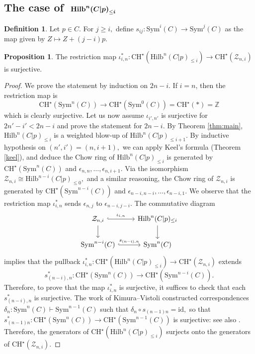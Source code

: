 \documentclass[10.5pt]{amsart}
\theoremstyle{definition}
\theoremstyle{definition}
\theoremstyle{definition}
\theoremstyle{definition}
\newtheorem{proposition}[theorem]{Proposition}
\newtheorem{definition}[theorem]{Definition}
\newcommand{\Hilb}{\mathrm{Hilb}}
\newcommand{\Sym}{\mathrm{Sym}}
\newcommand{\ra}{\rightarrow}
\newcommand{\CHs}{\mathrm{CH}^\star}
\newcommand{\cZ}{\mathcal{Z}}
\newcommand{\bZ}{\mathbb{Z}}
\begin{document}
\subsection{The case of $\textbf{ \text{Hilb}}^{\boldsymbol{n}}{\boldsymbol{(C|p)}}_{\le \boldsymbol{i}}$}
\begin{definition}\label{def:symimmersiononepoint}
    Let $p\in C.$ For $j\geq i,$ define $s_{ij}: \Sym^i(C) \ra \Sym^j(C)$ as the map given by $Z\mapsto Z + (j-i)p.$
\end{definition}



\begin{proposition}
The restriction map $\iota_{i,n}^*:\mathrm{CH}^\star(\Hilb^{n}(C|p)_{\leq i})\to \mathrm{CH}^\star(\cZ_{n,i})$ is surjective.
\end{proposition}
\begin{proof}
    We prove the statement by induction on $2n-i$. If $i=n$, then the restriction map is $$\CHs (\Sym^n(C)) \ra \CHs (\Sym^0(C))=\CHs (*)=\bZ$$ which is clearly surjective. 
    Let us now assume $\iota_{i',n'}$ is surjective for $2n'-i'< 2n-i$ and prove the statement for $2n-i$.
     By Theorem \ref{thm:main}, $\Hilb^n(C|p)_{\le i}$ is a weighted blow-up of $\Hilb^n(C|p)_{\le i+1}.$ By inductive hypothesis on $(n',i') = (n,i+1),$ we can apply Keel's formula (Theorem \ref{keel}), and deduce the Chow ring of $\Hilb^{n}(C|p)_{\leq i}$ is generated by $\mathrm{CH}^\star(\mathrm{Sym}^n(C))$ and $\epsilon_{n,n}, \dots, \epsilon_{n, i+1}.$ Via the isomorphism $\cZ_{n,i}\cong \Hilb^{n-i}(C|p)_{\leq 0},$ and a similar reasoning, the Chow ring of $\cZ_{n,i}$ is generated by $\mathrm{CH}^\star(\mathrm{Sym}^{n-i}(C))$ and $\epsilon_{n-i,n-i}, \dots, \epsilon_{n-i, 1}.$ We observe that the restriction map $\iota_{i,n}^*$ sends $\epsilon_{n,j}$ to $\epsilon_{n-i, j-i}.$ The commutative diagram \[\begin{tikzcd}
	{\cZ_{n,i}} & {\Hilb^{n}(C|p)_{\leq i}} \\
	{\mathrm{Sym}^{n-i}(C)} & {\mathrm{Sym}^{n}(C)}
	\arrow[hook, from=1-1, to=1-2, "\iota_{i,n}"]
	\arrow[from=1-1, to=2-1]
	\arrow[from=1-2, to=2-2]
	\arrow[hook, from=2-1, to=2-2, "s_{(n-i),n}"]
    \end{tikzcd}\] implies that the pullback $\iota_{i,n}^*: \mathrm{CH}^\star(\Hilb^{n}(C|p)_{\leq i})\to \CHs(\cZ_{n,i})$ extends $$s_{(n-i),n}^*: \mathrm{CH}^\star(\mathrm{Sym}^{n}(C))\to \mathrm{CH}^\star(\mathrm{Sym}^{n-i}(C)).$$ Therefore, to prove that the map $\iota_{i,n}^*$ is surjective, it suffices to check that each $s_{(n-i),n}^*$ is surjective. The work of Kimura--Vistoli \cite[§1.8]{KV96} constructed correspondences $\delta_n: \mathrm{Sym}^n(C)\vdash \mathrm{Sym}^{n-1}(C)$ such that $\delta_n\circ s_{(n-1)n} = \mathrm{id},$ so that $s_{(n-1)n}^*: \mathrm{CH}^\star(\mathrm{Sym}^{n}(C))\to \mathrm{CH}^\star(\mathrm{Sym}^{n-1}(C))$ is surjective: see also \cite[Remark 5.4]{Yin2016}. Therefore, the generators of $\mathrm{CH}^\star(\Hilb^{n}(C|p)_{\leq i})$ surjects onto the generators of $\mathrm{CH}^\star(\cZ_{n,i}).$ 
\end{proof}
\end{document}

